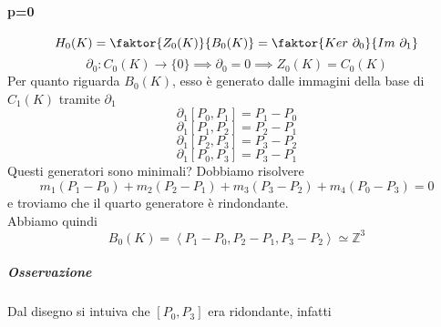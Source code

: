\documentclass[a4paper]{report}
\newcommand{\Z}{\ensuremath{\mathbb{Z}}}
\newcommand{\ra}{\ensuremath{\rightarrow}}
\newcommand{\gen}[1]{\ensuremath{\left<{#1}\right>}}
\begin{document}
\paragraph{p=0}
\[
    H_0(K)=\faktor{Z_0(K)}{B_0(K)}=\faktor{Ker\ \partial_0}{Im\ \partial_1}
\]
\[
    \partial_0:C_0(K)\ra\{0\}\implies\partial_0=0\implies Z_0(K)=C_0(K)
\]
Per quanto riguarda $B_0(K)$, esso è generato dalle immagini della base di $C_1(K)$ tramite $\partial_1$
\[
    \partial_1[P_0,P_1]=P_1-P_0
\]
\[
    \partial_1[P_1,P_2]=P_2-P_1
\]
\[
    \partial_1[P_2,P_3]=P_3-P_2
\]
\[
    \partial_1[P_0,P_3]=P_3-P_1
\]
\pagebreak
Questi generatori sono minimali? Dobbiamo risolvere
\[
    m_1(P_1-P_0)+m_2(P_2-P_1)+m_3(P_3-P_2)+m_4(P_0-P_3)=0
\]
e troviamo che il quarto generatore è rindondante.\\
Abbiamo quindi
\[
    B_0(K)=\gen{P_1-P_0,P_2-P_1,P_3-P_2}\simeq\Z^3
\]
\subparagraph{Osservazione}
Dal disegno si intuiva che $[P_0,P_3]$ era ridondante, infatti
\end{document}
